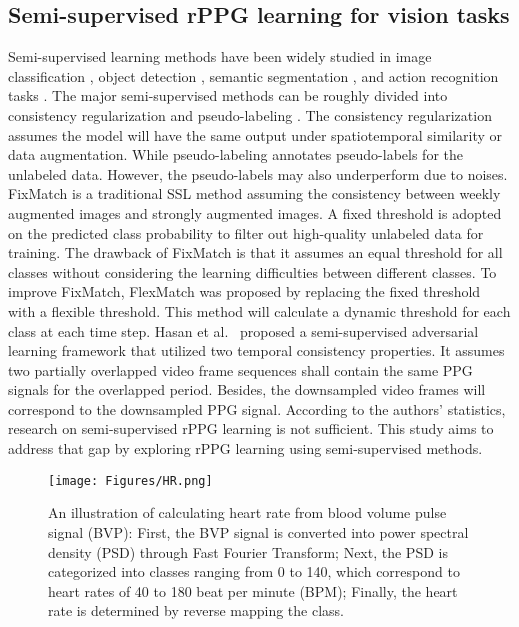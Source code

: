 \subsection{Semi-supervised rPPG learning for vision tasks}
Semi-supervised learning methods have been widely studied in image classification \cite{tarvainen2017mean}, object detection \cite{li2022rethinking}, semantic segmentation \cite{alonso2021semi}, and action recognition tasks \cite{jing2021videossl}. The major semi-supervised methods can be roughly divided into consistency regularization and pseudo-labeling \cite{he2023pseudo}. The consistency regularization assumes the model will have the same output under spatiotemporal similarity or data augmentation. While pseudo-labeling annotates pseudo-labels for the unlabeled data. However, the pseudo-labels may also underperform due to noises. FixMatch \cite{sohn2020fixmatch} is a traditional SSL method assuming the consistency between weekly augmented images and strongly augmented images. A fixed threshold is adopted on the predicted class probability to filter out high-quality unlabeled data for training. The drawback of FixMatch is that it assumes an equal threshold for all classes without considering the learning difficulties between different classes. To improve FixMatch, FlexMatch \cite{zhang2021flexmatch} was proposed by replacing the fixed threshold with a flexible threshold. This method will calculate a dynamic threshold for each class at each time step. Hasan et al.~\cite{hasan2023srppg} proposed a semi-supervised adversarial learning framework that utilized two temporal consistency properties. It assumes two partially overlapped video frame sequences shall contain the same PPG signals for the overlapped period. Besides, the downsampled video frames will correspond to the downsampled PPG signal. According to the authors' statistics, research on semi-supervised rPPG learning is not sufficient. This study aims to address that gap by exploring rPPG learning using semi-supervised methods.



\begin{figure*}[t]
\centering
\texttt{[image: Figures/HR.png]}
  \caption{\small{
  An illustration of calculating heart rate from blood volume pulse signal (BVP): First, the BVP signal is converted into power spectral density (PSD) through Fast Fourier Transform; Next, the PSD is categorized into classes ranging from 0 to 140, which correspond to heart rates of 40 to 180  beat per minute (BPM); Finally, the heart rate is determined by reverse mapping the class.
  }
  }
\label{fig:bvp_to_classes}
\end{figure*}